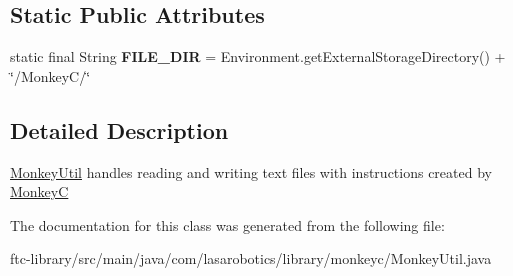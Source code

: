 \subsection*{Static Public Attributes}
\begin{DoxyCompactItemize}
\item 
\hypertarget{classcom_1_1lasarobotics_1_1library_1_1monkeyc_1_1_monkey_util_a1da99dbc3d38e23e17ac51a39ea1a18b}{}static final String {\bfseries F\+I\+L\+E\+\_\+\+D\+I\+R} = Environment.\+get\+External\+Storage\+Directory() + \char`\"{}/Monkey\+C/\char`\"{}\label{classcom_1_1lasarobotics_1_1library_1_1monkeyc_1_1_monkey_util_a1da99dbc3d38e23e17ac51a39ea1a18b}

\end{DoxyCompactItemize}


\subsection{Detailed Description}
\hyperlink{classcom_1_1lasarobotics_1_1library_1_1monkeyc_1_1_monkey_util}{Monkey\+Util} handles reading and writing text files with instructions created by \hyperlink{classcom_1_1lasarobotics_1_1library_1_1monkeyc_1_1_monkey_c}{Monkey\+C} 

The documentation for this class was generated from the following file\+:\begin{DoxyCompactItemize}
\item 
ftc-\/library/src/main/java/com/lasarobotics/library/monkeyc/Monkey\+Util.\+java\end{DoxyCompactItemize}
